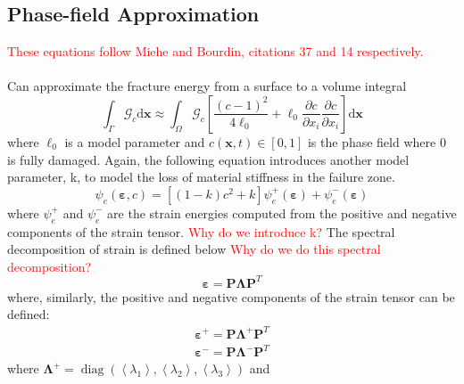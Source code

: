 \documentclass[12pt,3p]{article}
\numberwithin{equation}{section}
\begin{document}
\subsection{Phase-field Approximation}
\textcolor{red}{These equations follow Miehe and Bourdin, citations 37 and 14 respectively.} \\ \\
Can approximate the fracture energy from a surface to a volume integral 
\begin{equation}\label{FractureSurfVol}
\int_{\Gamma} \mathcal{G}_{c} \mathrm{d} \boldsymbol{x} \approx \int_{\Omega} \mathcal{G}_{c}\left[\frac{(c-1)^{2}}{4 \ell_{0}}+\ell_{0} \frac{\partial c}{\partial x_{i}} \frac{\partial c}{\partial x_{i}}\right] \mathrm{d} \boldsymbol{x}
\end{equation}
where $\ell_0$ is a model parameter and $c(\boldsymbol{x}, t) \in[0,1]$ is the phase field where 0 is fully damaged. Again, the following equation introduces another model parameter, k, to model the loss of material stiffness in the failure zone. 
\begin{equation}\label{MatStiff}
\psi_{e}(\boldsymbol{\varepsilon}, c)=\left[(1-k) c^{2}+k\right] \psi_{e}^{+}(\boldsymbol{\varepsilon})+\psi_{e}^{-}(\boldsymbol{\varepsilon})
\end{equation}
where $\psi_{e}^{+}$ and $\psi_{e}^{-}$ are the strain energies computed from the positive and negative components of the strain tensor. \textcolor{red}{Why do we introduce k?} The spectral decomposition of strain is defined below \textcolor{red}{Why do we do this spectral decomposition?}
\begin{equation}\label{SpectDecStrain}
\boldsymbol{\varepsilon}=\mathbf{P} \mathbf{\Lambda} \mathbf{P}^{T}
\end{equation}
where, similarly, the positive and negative components of the strain tensor can be defined: 
\begin{equation}\label{PosNegStrain}
\begin{array}{l}
\boldsymbol{\varepsilon}^{+}=\mathbf{P} \mathbf{\Lambda}^{+} \mathbf{P}^{T} \\
\boldsymbol{\varepsilon}^{-}=\mathbf{P} \mathbf{\Lambda}^{-} \mathbf{P}^{T}
\end{array}
\end{equation}
where $\boldsymbol{\Lambda}^{+}=\operatorname{diag}\left(\left\langle\lambda_{1}\right\rangle,\left\langle\lambda_{2}\right\rangle,\left\langle\lambda_{3}\right\rangle\right)$ and 
\end{document}
